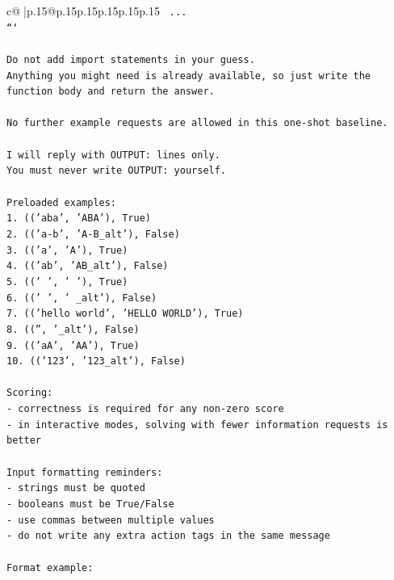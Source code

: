 \documentclass{article}
\begin{document}
{\begin{supertabular}{c@{$\;$}|p{.15\linewidth}@{}p{.15\linewidth}p{.15\linewidth}p{.15\linewidth}p{.15\linewidth}p{.15\linewidth}}
{{{\texttt{    ...} \\
\texttt{```} \\
\\ 
\texttt{Do not add import statements in your guess.} \\
\texttt{Anything you might need is already available, so just write the function body and return the answer.} \\
\\ 
\texttt{No further example requests are allowed in this one{-}shot baseline.} \\
\\ 
\texttt{I will reply with OUTPUT: lines only.} \\
\texttt{You must never write OUTPUT: yourself.} \\
\\ 
\texttt{Preloaded examples:} \\
\texttt{1. (('aba', 'ABA'), True)} \\
\texttt{2. (('a{-}b', 'A{-}B\_alt'), False)} \\
\texttt{3. (('a', 'A'), True)} \\
\texttt{4. (('ab', 'AB\_alt'), False)} \\
\texttt{5. (('   ', '   '), True)} \\
\texttt{6. ((' ', ' \_alt'), False)} \\
\texttt{7. (('hello world', 'HELLO WORLD'), True)} \\
\texttt{8. (('', '\_alt'), False)} \\
\texttt{9. (('aA', 'AA'), True)} \\
\texttt{10. (('123', '123\_alt'), False)} \\
\\ 
\texttt{Scoring:} \\
\texttt{{-} correctness is required for any non{-}zero score} \\
\texttt{{-} in interactive modes, solving with fewer information requests is better} \\
\\ 
\texttt{Input formatting reminders:} \\
\texttt{{-} strings must be quoted} \\
\texttt{{-} booleans must be True/False} \\
\texttt{{-} use commas between multiple values} \\
\texttt{{-} do not write any extra action tags in the same message} \\
\\ 
\texttt{Format example:} \\
}}}
\end{supertabular}}
\end{document}
